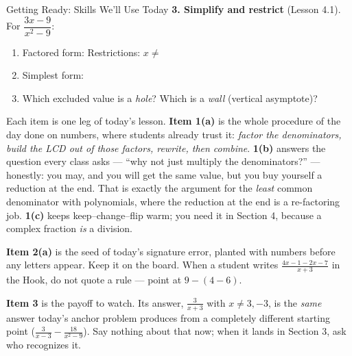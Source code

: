 \documentclass[10pt]{article}
\begin{document}
\begin{notesbox}{Getting Ready: Skills We'll Use Today}
\vspace{4pt}
\textbf{3. Simplify and restrict} (Lesson 4.1). For $\dfrac{3x-9}{x^2-9}$:
\begin{enumerate}[label=(\alph*), leftmargin=2.1em, itemsep=3pt]
  \item Factored form:  \quad Restrictions: $x\neq$ 
  \item Simplest form: 
  \item Which excluded value is a \emph{hole}?  \; Which is a \emph{wall} (vertical
        asymptote)? 
\end{enumerate}

\end{notesbox}

\begin{teachernote}
Each item is one leg of today's lesson. \textbf{Item 1(a)} is the whole procedure of the day done on
numbers, where students already trust it: \emph{factor the denominators, build the LCD out of those
factors, rewrite, then combine}. \textbf{1(b)} answers the question every class asks --- ``why not just
multiply the denominators?'' --- honestly: you may, and you will get the same value, but you buy
yourself a reduction at the end. That is exactly the argument for the \emph{least} common denominator
with polynomials, where the reduction at the end is a re-factoring job. \textbf{1(c)} keeps
keep--change--flip warm; you need it in Section 4, because a complex fraction \emph{is} a division.

\vspace{3pt}
\textbf{Item 2(a)} is the seed of today's signature error, planted with numbers before any letters
appear. Keep it on the board. When a student writes $\frac{4x-1-2x-7}{x+3}$ in the Hook, do not quote a
rule --- point at $9-(4-6)$.

\vspace{3pt}
\textbf{Item 3} is the payoff to watch. Its answer, $\frac{3}{x+3}$ with $x\neq3,-3$, is the
\emph{same} answer today's anchor problem produces from a completely different starting point
($\frac{3}{x-3}-\frac{18}{x^2-9}$). Say nothing about that now; when it lands in Section 3, ask who
recognizes it.
\end{teachernote}
\end{document}
